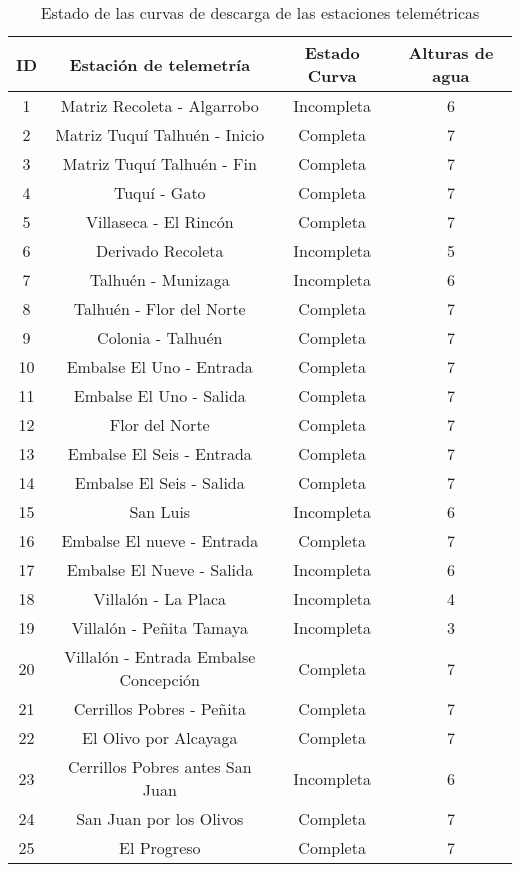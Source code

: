 \documentclass[]{article}
\begin{document}
\begin{table}[H]
 \caption{Estado de las curvas de descarga de las estaciones telemétricas}
 \centering
 \begin{tabu} {cccc}
 \toprule
 \textbf{ID} & \textbf{Estación de telemetría} & \textbf{Estado Curva} & \textbf{Alturas de agua}\\
 \midrule 
	
   1 & Matriz Recoleta - Algarrobo & Incompleta & 6\\
   2 & Matriz Tuquí Talhuén - Inicio & Completa & 7\\
   3 & Matriz Tuquí Talhuén - Fin & Completa & 7\\
   4 & Tuquí - Gato & Completa & 7\\
   5 & Villaseca - El Rincón & Completa & 7\\
   6 & Derivado Recoleta & Incompleta & 5\\
   7 & Talhuén - Munizaga & Incompleta & 6\\
   8 & Talhuén - Flor del Norte & Completa & 7\\
   9 & Colonia - Talhuén & Completa & 7\\
   10 & Embalse El Uno - Entrada & Completa & 7\\
   11 & Embalse El Uno - Salida & Completa & 7\\
   12 & Flor del Norte & Completa & 7\\
   13 & Embalse El Seis - Entrada & Completa & 7\\
   14 & Embalse El Seis - Salida & Completa & 7\\
   15 & San Luis & Incompleta & 6\\
   16 & Embalse El nueve - Entrada & Completa & 7\\
   17 & Embalse El Nueve - Salida & Incompleta & 6\\
   18 & Villalón - La Placa & Incompleta & 4\\
   19 & Villalón - Peñita Tamaya & Incompleta & 3\\
   20 & Villalón - Entrada Embalse Concepción & Completa & 7\\
   21 & Cerrillos Pobres - Peñita & Completa & 7\\
   22 & El Olivo por Alcayaga & Completa & 7\\
   23 & Cerrillos Pobres antes San Juan & Incompleta & 6\\
   24 & San Juan por los Olivos & Completa & 7\\
   25 & El Progreso & Completa & 7\\

\end{tabu}
\end{table}
\end{document}
